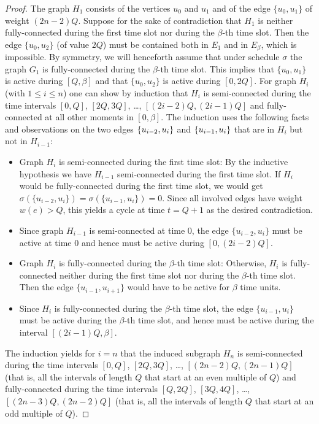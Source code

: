 \begin{proof}
The graph $H_1$ consists of the vertices $u_0$ and $u_1$ and of the edge $\{u_0, u_1\}$ of weight $(2n-2)Q$.
Suppose for the sake of contradiction that $H_1$ is neither fully-connected during the first time slot
nor during the $\beta$-th time slot.
Then the edge $\{u_0, u_2\}$ (of value $2Q$) must be contained both in $E_1$ and in $E_{\beta}$, which is impossible.
By symmetry, we will henceforth assume that under schedule $\sigma$ the graph $G_1$ is fully-connected 
during the $\beta$-th time slot.
This implies that $\{u_0, u_1\}$ is active during $[Q,\beta]$ and that $\{u_0, u_2\}$ is active during $[0,2Q]$.
For graph $H_i$ (with $1\le i\le n$) one can show by induction that $H_i$ is semi-connected
during the time intervals $[0,Q]$, $[2Q,3Q]$, \dots, $[(2i-2)Q,(2i-1)Q]$ and fully-connected at all
other moments in $[0,\beta]$.
The induction uses the following facts and observations on the two edges $\{ u_{i-2}, u_i \}$ 
and $\{ u_{i-1},u_i \}$ that are in $H_i$ but not in $H_{i-1}$:
\begin{itemize}
\item Graph $H_i$ is semi-connected during the first time slot:
By the inductive hypothesis we have $H_{i-1}$ semi-connected during the first time slot.
If $H_i$ would be fully-connected during the first time slot, we would get
$\sigma(\{u_{i-2}, u_i\}) = \sigma(\{u_{i-1}, u_i\})=0$. 
Since all involved edges have weight $w(e)>Q$, this yields a cycle at time $t=Q+1$ as the desired contradiction.
\item Since graph $H_{i-1}$ is semi-connected at time $0$, the edge $\{u_{i-2},u_i\}$ must be active at 
time $0$ and hence must be active during $[0,(2i-2)Q]$.
\item Graph $H_i$ is fully-connected during the $\beta$-th time slot:
Otherwise, $H_i$ is fully-connected neither during the first time slot nor during the $\beta$-th time slot. 
Then the edge $\{u_{i-1},u_{i+1}\}$ would have to be active for $\beta$ time units.
\item Since $H_i$ is fully-connected during the $\beta$-th time slot, the edge $\{u_{i-1},u_i\}$ must be 
active during the $\beta$-th time slot, and hence must be active during the interval $[(2i-1)Q,\beta]$.
\end{itemize}
The induction yields for $i=n$ that the induced subgraph $H_n$ is semi-connected during the time intervals 
$[0,Q]$, $[2Q,3Q]$, \dots, $[(2n-2)Q,(2n-1)Q]$ (that is, all the intervals of length $Q$ that start at an 
even multiple of $Q$)
and fully-connected during the time intervals $[Q,2Q]$, $[3Q,4Q]$, \dots, $[(2n-3)Q,(2n-2)Q]$ (that is, all the 
intervals of length $Q$ that start at an odd multiple of $Q$).


\end{proof}

